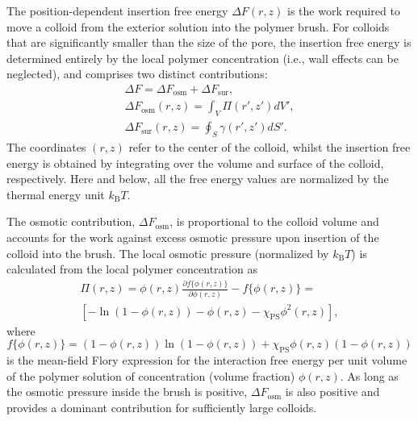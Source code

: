 \documentclass[12pt, a4paper]{article}
\begin{document}
The position-dependent insertion free energy $\Delta F(r,z)$ is the work required to move a colloid from the exterior solution into the polymer brush.
For colloids that are significantly smaller than the size of the pore, the insertion free energy is determined entirely by the local polymer concentration (i.e., wall effects can be neglected), and comprises two distinct contributions:
\begin{eqnarray}
    \Delta F = \Delta F_{\text{osm}} + \Delta F_{\text{sur}},
    \label{eq:Delta_F}
    \\
    \Delta F_{\text{osm}}(r,z) = \int_{V} \Pi(r',z') dV', \nonumber
    \\
    \Delta F_{\text{sur}}(r,z) = \oint_{S} \gamma (r',z') dS'. \nonumber
\end{eqnarray}
The coordinates $(r,z)$ refer to the center of the colloid, whilst the insertion free energy is obtained by integrating over the volume and surface of the colloid, respectively.
Here and below, all the free energy values are normalized by the thermal energy unit $k_{\text{B}}T$.

The osmotic contribution, $\Delta F_{\text{osm}}$, is proportional to the colloid volume and accounts for the work against excess osmotic pressure upon insertion of the colloid into the brush.
The local osmotic pressure (normalized by $k_\text{B} T$) is calculated from the local polymer concentration as
\begin{equation}
    \begin{aligned}
        \Pi(r,z)=  \phi(r,z)\frac{\partial f\{\phi(r,z)\}}{\partial \phi(r,z)} - f\{\phi(r,z)\}= 
        \\
        [-\ln(1-\phi(r,z)) - \phi(r,z) -\chi_{\text{PS}}\phi^2(r,z)],
    \end{aligned}
    \label{eq:osmotic}
\end{equation}
where 
$$
f\{\phi(r,z)\}=(1-\phi(r,z))\ln(1-\phi(r,z)) +\chi_{\text{PS}}\phi(r,z)(1-\phi(r,z))
$$
is the mean-field Flory expression for the interaction free energy per unit volume of the polymer solution of concentration (volume fraction) $\phi(r,z)$.
As long as the osmotic pressure inside the brush is positive, $\Delta F_{\text{osm}}$ is also positive and provides a dominant contribution for sufficiently large colloids.
\end{document}
